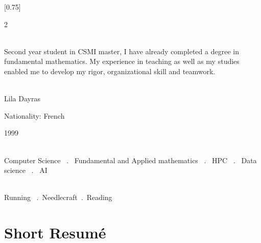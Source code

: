 \documentclass[lighthipster]{simplehipstercv}
\begin{document}
\setlength{\columnsep}{1.5cm}
[0.75]
\begin{paracol}{2}

\paracolbackgroundoptions



\footnotesize
{\setasidefontcolour
\flushright
\begin{center}
\end{center}

\\[0.5em]

Second year student in CSMI master, I have already completed a degree in fundamental mathematics. 
My experience in teaching as well as my studies enabled me to develop my rigor, organizational skill and teamwork. 
\bigskip

 \\[0.5em]
Lila Dayras

Nationality: French 

1999

\bigskip

 \\[0.5em]

Computer Science ~.~ Fundamental and Applied mathematics ~.~ HPC ~.~ Data science ~.~ AI

\bigskip



\bigskip

\\[0.5em]

Running ~.~Needlecraft~.~Reading

\bigskip


\vspace{4em}



\phantom{turn the page}

\phantom{turn the page}
}
\switchcolumn

\small
\section*{Short Resumé}


\end{paracol}
\end{document}
